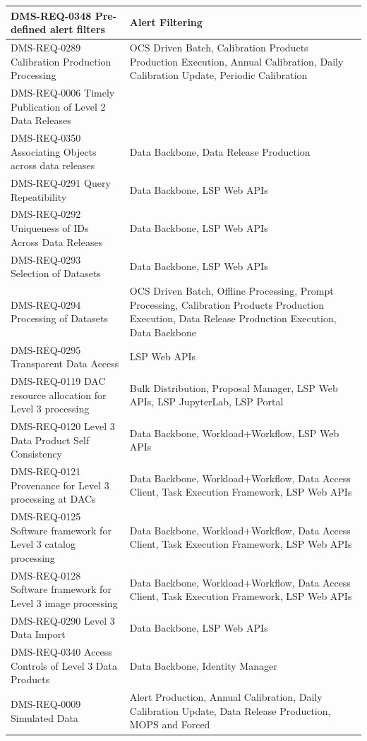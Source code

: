 \documentclass[DM,lsstdraft,toc]{lsstdoc}
\begin{document}
\begin{xtabular}{|p{0.4\textwidth}|p{0.55\textwidth}|}
DMS-REQ-0348 Pre-defined alert filters & Alert Filtering\\ \hline
DMS-REQ-0289 Calibration Production Processing & OCS Driven Batch,
Calibration Products Production Execution, Annual Calibration, Daily
Calibration Update, Periodic Calibration\\ \hline
DMS-REQ-0006 Timely Publication of Level 2 Data Releases
&\\ \hline
DMS-REQ-0350 Associating Objects across data releases & Data Backbone,
Data Release Production\\ \hline
DMS-REQ-0291 Query Repeatibility & Data Backbone, LSP Web APIs\\ \hline
DMS-REQ-0292 Uniqueness of IDs Across Data Releases & Data Backbone, LSP Web APIs\\ \hline
DMS-REQ-0293 Selection of Datasets & Data Backbone, LSP Web APIs\\ \hline
DMS-REQ-0294 Processing of Datasets & OCS Driven Batch, Offline
Processing, Prompt Processing, Calibration Products Production
Execution, Data Release Production Execution, Data
Backbone\\ \hline
DMS-REQ-0295 Transparent Data Access & LSP Web APIs\\ \hline
DMS-REQ-0119 DAC resource allocation for Level 3 processing & Bulk
Distribution, Proposal Manager, LSP Web APIs, LSP JupyterLab, LSP
Portal\\ \hline
DMS-REQ-0120 Level 3 Data Product Self Consistency & Data Backbone,
Workload+Workflow, LSP Web APIs\\ \hline
DMS-REQ-0121 Provenance for Level 3 processing at DACs & Data Backbone,
Workload+Workflow, Data Access Client, Task Execution Framework, LSP Web APIs\\ \hline
DMS-REQ-0125 Software framework for Level 3 catalog processing & Data
Backbone, Workload+Workflow, Data Access Client, Task Execution
Framework, LSP Web APIs\\ \hline
DMS-REQ-0128 Software framework for Level 3 image processing & Data
Backbone, Workload+Workflow, Data Access Client, Task Execution
Framework, LSP Web APIs\\ \hline
DMS-REQ-0290 Level 3 Data Import & Data Backbone, LSP Web APIs\\ \hline
DMS-REQ-0340 Access Controls of Level 3 Data Products & Data Backbone,
Identity Manager\\ \hline
DMS-REQ-0009 Simulated Data & Alert Production, Annual Calibration,
Daily Calibration Update, Data Release Production, MOPS and Forced

\end{xtabular}
\end{document}
